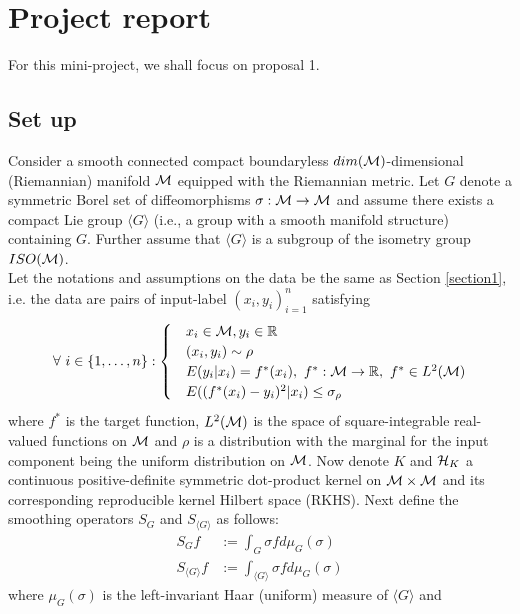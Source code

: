 

\section{Project report}
For this mini-project, we shall focus on proposal 1.
\subsection{Set up}
Consider a smooth connected compact boundaryless $dim(\mathcal{M})$-dimensional (Riemannian) manifold $\mathcal{M}$ equipped with the Riemannian metric. Let $G$ denote a symmetric Borel set of diffeomorphisms $\sigma: \mathcal{M} \to \mathcal{M}$ and assume there exists a compact Lie group $\langle G \rangle$ (i.e., a group with a smooth manifold structure) containing $G$. Further assume that $\langle G \rangle$ is a subgroup of the isometry group $ISO(\mathcal{M})$.\\
Let the notations and assumptions on the data be the same as Section \ref{section1}, i.e. the data are pairs of input-label $(x_i,y_i)^n_{i=1}$ satisfying
\begin{align}
\begin{alignedat}{3}
\forall\ i\in \{1,\ldots,n\}:
\begin{cases}
&x_i\in \mathcal{M}, y_i\in \mathbb{R}\\
&(x_i,y_i)\sim \rho\\
&E(y_i|x_i) = f^*(x_i),\ f^*:\mathcal{M}\to \mathbb{R},\ f^*\in L^2(\mathcal{M})\\
&E((f^*(x_i)-y_i)^2|x_i)\le \sigma_\rho
\end{cases}
\end{alignedat}
\end{align}
where $f^*$ is the target function, $L^2(\mathcal{M})$ is the space of square-integrable real-valued functions on $\mathcal{M}$ and $\rho$ is a distribution with the marginal for the input component being the uniform distribution on $\mathcal{M}$. Now denote $K$ and $\mathcal{H}_K$ a continuous positive-definite symmetric dot-product kernel on $\mathcal{M}\times\mathcal{M}$ and its corresponding reproducible kernel Hilbert space (RKHS). Next define the smoothing operators $S_G$ and $S_{\langle G \rangle}$ as follows:
\begin{align}
    S_Gf &:= \int_G \sigma f d\mu_G(\sigma) \label{S_G}\\
    S_{\langle G \rangle}f &:= \int_{\langle G \rangle} \sigma f d\mu_G(\sigma)
\end{align}
where $\mu_G(\sigma)$ is the left-invariant Haar (uniform) measure of $\langle G \rangle$ and
